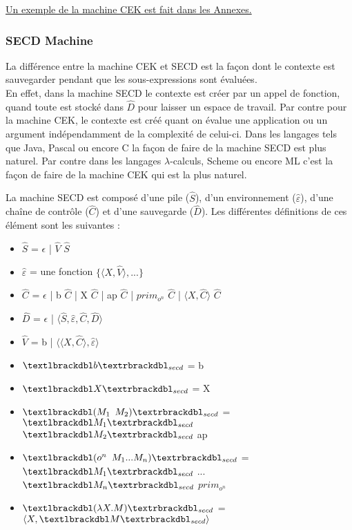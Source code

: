 \documentclass[10pt,a4paper]{article}
\begin{document}
					
					\hyperref[CEK]{Un exemple de la machine CEK est fait dans les Annexes.}
					
					\newpage
					
				\subsubsection{SECD Machine}
					La différence entre la machine CEK et SECD est la façon dont le contexte est sauvegarder pendant que les sous-expressions sont évaluées.\\
					En effet, dans la machine SECD le contexte est créer par un appel de fonction, quand toute est stocké dans $\widehat{D}$ pour laisser un espace de travail. Par contre pour la machine CEK, le contexte est créé quant on évalue une application ou un argument indépendamment de la complexité de celui-ci.
					\smallbreak 
					Dans les langages tels que Java, Pascal ou encore C la façon de faire de la machine SECD est plus naturel. Par contre  dans les langages $\lambda$-calculs, Scheme ou encore ML c'est la façon de faire de la machine CEK qui est la plus naturel.
					\medbreak
					
					La machine SECD est composé d'une pile ($\widehat{S}$), d'un environnement ($\widehat{\varepsilon}$), d'une chaîne de contrôle ($\widehat{C}$) et d'une sauvegarde ($\widehat{D}$). Les différentes définitions de ces élément sont les suivantes :
					\smallbreak
					\begin{itemize}
						\item[] $\widehat{S}$ = $\epsilon$ | $\widehat{V}$ $\widehat{S}$ 
						\item[] $\widehat{\varepsilon}$ = une fonction $\{\langle X,\widehat{V}\rangle,...\}$
						\item[] $\widehat{C}$ = $\epsilon$ | b $\widehat{C}$ | X $\widehat{C}$ | ap $\widehat{C}$ | $prim_{o^{n}}$ $\widehat{C}$ | $\langle X,\widehat{C}\rangle$ $\widehat{C}$
						\item[] $\widehat{D}$ = $\epsilon$ | $\langle\widehat{S},\widehat{\varepsilon},\widehat{C},\widehat{D}\rangle$
						\item[] $\widehat{V}$ = b | $\langle\langle X,\widehat{C}\rangle,\widehat{\varepsilon}\rangle$
						\item[] $\textlbrackdbl b\textrbrackdbl _{secd}$ = b
						\item[] $\textlbrackdbl X\textrbrackdbl _{secd}$ = X
						\item[] $\textlbrackdbl (M_{1}$ $M_{2})\textrbrackdbl _{secd}$ = $\textlbrackdbl M_{1}\textrbrackdbl _{secd}$ $\textlbrackdbl M_{2}\textrbrackdbl _{secd}$ ap
						\item[] $\textlbrackdbl (o^{n}$ $M_{1}...M_{n})\textrbrackdbl _{secd}$ = $\textlbrackdbl M_{1}\textrbrackdbl _{secd}$ $...$ $\textlbrackdbl M_{n}\textrbrackdbl _{secd}$ $prim_{o^{n}}$
						\item[]  $\textlbrackdbl(\lambda X.M)\textrbrackdbl _{secd}$ =  $\langle X,\textlbrackdbl M\textrbrackdbl _{secd}\rangle$
					\end{itemize}
					\bigbreak
					
\end{document}
